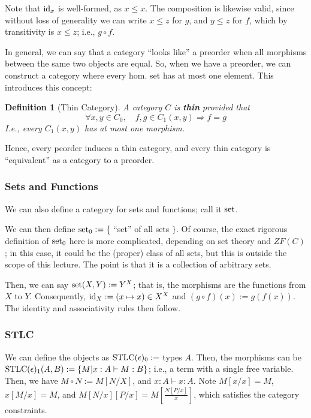 \documentclass[12pt]{article}
\newtheorem{definition}{Definition}
\begin{document}
Note that $\textmd{id}_x$ is well-formed, as $x \leq x$. The composition is likewise valid, since without loss of generality we can write $x \leq z$ for $g$, and $y \leq z$ for $f$, which by transitivity is $x \leq z$; i.e., $g \circ f$.

\vspace{5mm}

In general, we can say that a category ``looks like'' a preorder when all morphisms between the same two objects are equal. So, when we have a preorder, we can construct a category where every hom. set has at most one element. This introduces this concept:

\begin{definition}[Thin Category]
    A category $C$ is \textbf{thin} provided that
    $$\forall x,y \in C_0, \quad f,g \in C_1(x,y) \Rightarrow f = g$$
    I.e., every $C_1(x,y)$ has at most one morphism.
\end{definition}

Hence, every peorder induces a thin category, and every thin category is ``equivalent'' as a category to a preorder.

\subsubsection{Sets and Functions}
We can also define a category for sets and functions; call it $\textmd{set}$.

We can then define $\textmd{set}_0 := \{$ ``set'' of all sets $\}$. Of course, the exact rigorous definition of $\textmd{set}_0$ here is more complicated, depending on set theory and $ZF(C)$; in this case, it could be the (proper) class of all sets, but this is outside the scope of this lecture. The point is that it is a collection of arbitrary sets.

Then, we can say $\textmd{set}(X,Y) := Y^X$; that is, the morphisms are the functions from $X$ to $Y$. Consequently, $\textmd{id}_X := (x \mapsto x) \in X^X$ and $(g \circ f)(x) := g(f(x))$. The identity and associativity rules then follow.

\subsubsection{STLC}

We can define the objects as $\textmd{STLC}(\epsilon)_0 :=$ types $A$. Then, the morphisms can be $\textmd{STLC}(\epsilon)_1(A,B) := \{M | x:A \vdash M :B \}$; i.e., a term with a single free variable. Then, we have $M \circ N := M[N/X]$, and $x:A \vdash x:A$. Note $M[x/x] = M$, $x[M/x] = M$, and $M[N/x][P/x] = M\left[\frac{N[P/x]}{x}\right]$, which satisfies the category constraints.
\end{document}
